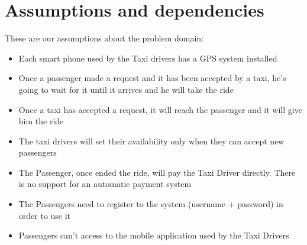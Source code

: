 \section{Assumptions and dependencies}
These are our assumptions about the problem domain:
\begin{itemize}
\item Each smart phone used by the Taxi drivers has a GPS system installed
\item Once a passenger made a request and it has been accepted by a taxi, he's going to wait for it until it arrives and he will take the ride
\item Once a taxi has accepted a request, it will reach the passenger and it will give him the ride
\item The taxi drivers will set their availability only when they can accept new passengers
\item The Passenger, once ended the ride, will pay the Taxi Driver directly. There is no support for an automatic payment system
\item The Passengers need to register to the system (username + password) in order to use it
\item Passengers can't access to the mobile application used by the Taxi Drivers
\end{itemize}